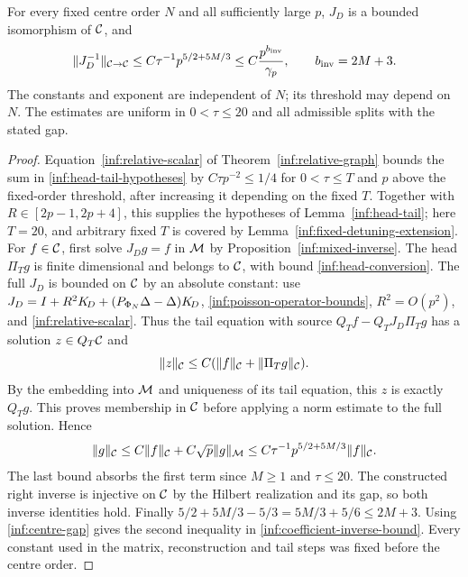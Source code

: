\begin{theorem}\label{inf:coefficient-inverse}
For every fixed centre order $N$ and all sufficiently large $p$,
$J_D$ is a bounded isomorphism of $\mathcal C$, and
\begin{equation}\label{inf:coefficient-inverse-bound}
 \lVert J_D^{-1}\rVert_{\mathcal C\to\mathcal C}
 \le C\tau^{-1}p^{5/2+5M/3}
 \le C\frac{p^{b_{\mathrm{inv}}}}{\gamma_p},
 \qquad b_{\mathrm{inv}}=2M+3.
\end{equation}
The constants and exponent are independent of $N$; its threshold
may depend on $N$. The estimates are uniform in
$0<\tau\le20$ and all admissible splits with the stated gap.
\end{theorem}
\begin{proof}
Equation~\eqref{inf:relative-scalar} of
Theorem~\ref{inf:relative-graph} bounds the sum in
\eqref{inf:head-tail-hypotheses} by $C\tau p^{-2}\le1/4$
for $0<\tau\le T$ and $p$ above the fixed-order threshold,
after increasing it depending on the fixed $T$.
Together with $R\in[2p-1,2p+4]$, this supplies the hypotheses
of Lemma~\ref{inf:head-tail}; here $T=20$, and arbitrary fixed
$T$ is covered by Lemma~\ref{inf:fixed-detuning-extension}.
For $f\in\mathcal C$, first solve $J_Dg=f$ in $\mathcal M$ by
Proposition~\ref{inf:mixed-inverse}.
The head $\Pi_Tg$ is finite dimensional and belongs to $\mathcal C$,
with bound \eqref{inf:head-conversion}.
The full $J_D$ is bounded on $\mathcal C$ by an absolute constant:
use $J_D=I+R^2K_{\!D}+(P_{\Phi_N}\Delta-\Delta)K_{\!D}$,
\eqref{inf:poisson-operator-bounds}, $R^2=O(p^2)$, and
\eqref{inf:relative-scalar}.
Thus the tail equation with source
$Q_Tf-Q_TJ_D\Pi_Tg$ has a solution $z\in Q_T\mathcal C$ and
\[
 \lVert z\rVert_\mathcal C\le C(\lVert f\rVert_\mathcal C+\lVert \Pi_Tg\rVert_\mathcal C).
\]
By the embedding into $\mathcal M$ and uniqueness of its tail equation,
this $z$ is exactly $Q_Tg$.
This proves membership in $\mathcal C$ before applying a norm estimate
to the full solution. Hence
\[
 \lVert g\rVert_\mathcal C\le C\lVert f\rVert_\mathcal C+
                      C\sqrt p\lVert g\rVert_{\mathcal M}
 \le C\tau^{-1}p^{5/2+5M/3}\lVert f\rVert_\mathcal C.
\]
The last bound absorbs the first term since $M\ge1$ and
$\tau\le20$.
The constructed right inverse is injective on $\mathcal C$ by the
Hilbert realization and its gap, so both inverse identities hold.
Finally
$5/2+5M/3-5/3=5M/3+5/6\le2M+3$.
Using \eqref{inf:centre-gap} gives the second inequality in
\eqref{inf:coefficient-inverse-bound}.
Every constant used in the matrix, reconstruction and tail steps
was fixed before the centre order.
\end{proof}
